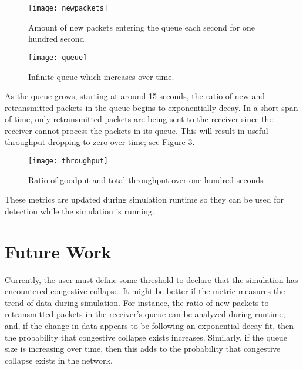 \documentclass{article}
\begin{document}
\begin{figure}[H]
	\texttt{[image: newpackets]}
	\centering
	\caption{Amount of new packets entering the queue each second for one hundred second}
	\label{fig-packets}
\end{figure}

\begin{figure}[H]
	\texttt{[image: queue]}
	\centering
	\caption{Infinite queue which increases over time.}
	\label{fig-queue}
\end{figure}

As the queue grows, starting at around 15 seconds, the ratio of new and retransmitted packets in the queue begins to exponentially decay. In a short span of time, only retransmitted packets are being sent to the receiver since the receiver cannot process the packets in its queue. This will result in useful throughput dropping to zero over time; see Figure \ref{fig-ratio}.

\begin{figure}[H]
	\texttt{[image: throughput]}
	\centering
	\caption{Ratio of goodput and total throughput over one hundred seconds}
	\label{fig-ratio}
\end{figure}

These metrics are updated during simulation runtime so they can be used for detection while the simulation is running.

\section{Future Work}
Currently, the user must define some threshold to declare that the simulation has encountered congestive collapse. It might be better if the metric measures the trend of data during simulation. For instance, the ratio of new packets to retransmitted packets in the receiver's queue can be analyzed during runtime, and, if the change in data appears to be following an exponential decay fit, then the probability that congestive collapse exists increases. Similarly, if the queue size is increasing over time, then this adds to the probability that congestive collapse exists in the network.



\end{document}
